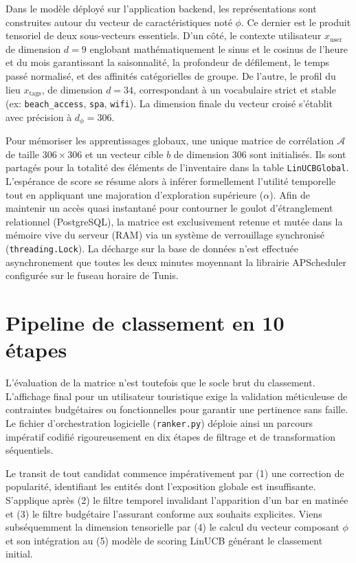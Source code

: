 Dans le modèle déployé sur l'application backend, les représentations sont construites autour du vecteur de caractéristiques noté $\phi$. Ce dernier est le produit tensoriel de deux sous-vecteurs essentiels. D'un côté, le contexte utilisateur $x_{\text{user}}$ de dimension $d=9$ englobant mathématiquement le sinus et le cosinus de l'heure et du mois garantissant la saisonnalité, la profondeur de défilement, le temps passé normalisé, et des affinités catégorielles de groupe. De l'autre, le profil du lieu $x_{\text{tags}}$, de dimension $d=34$, correspondant à un vocabulaire strict et stable (ex: \texttt{beach\_access}, \texttt{spa}, \texttt{wifi}). La dimension finale du vecteur croisé s'établit avec précision à $d_{\phi} = 306$.

Pour mémoriser les apprentissages globaux, une unique matrice de corrélation $\mathcal{A}$ de taille $306 \times 306$ et un vecteur cible $b$ de dimension $306$ sont initialisés. Ils sont partagés pour la totalité des éléments de l'inventaire dans la table \texttt{LinUCBGlobal}. L'espérance de score se résume alors à inférer formellement l'utilité temporelle tout en appliquant une majoration d'exploration supérieure ($\alpha$). Afin de maintenir un accès quasi instantané pour contourner le goulot d'étranglement relationnel (PostgreSQL), la matrice est exclusivement retenue et mutée dans la mémoire vive du serveur (RAM) via un système de verrouillage synchronisé (\texttt{threading.Lock}). La décharge sur la base de données n'est effectuée asynchronement que toutes les deux minutes moyennant la librairie APScheduler configurée sur le fuseau horaire de Tunis.

\section{Pipeline de classement en 10 étapes}

L'évaluation de la matrice n'est toutefois que le socle brut du classement. L'affichage final pour un utilisateur touristique exige la validation méticuleuse de contraintes budgétaires ou fonctionnelles pour garantir une pertinence sans faille. Le fichier d'orchestration logicielle (\texttt{ranker.py}) déploie ainsi un parcours impératif codifié rigoureusement en dix étapes de filtrage et de transformation séquentiels.

Le transit de tout candidat commence impérativement par (1) une correction de popularité, identifiant les entités dont l'exposition globale est insuffisante. S'applique après (2) le filtre temporel invalidant l'apparition d'un bar en matinée et (3) le filtre budgétaire l'assurant conforme aux souhaits explicites. Viens subséquemment la dimension tensorielle par (4) le calcul du vecteur composant $\phi$ et son intégration au (5) modèle de scoring LinUCB générant le classement initial.

